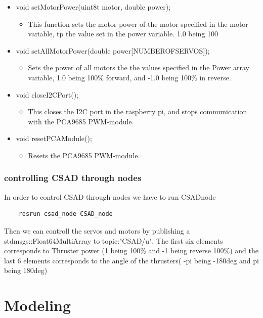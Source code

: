 \begin{itemize}
  \item void setMotorPower(uint8\textunderscore t motor, double power);  \begin{itemize}
    \item This function sets the motor power of the motor specified in the motor variable, tp the value set in the power variable. 1.0 being 100%
  \end{itemize}
  \item void setAllMotorPower(double power[NUMBER\textunderscore OF\textunderscore SERVOS]);  
  \begin{itemize}
    \item Sets the power of all motors the the values specified in the Power array variable,  1.0 being 100\% forward, and -1.0 being 100\% in reverse.
  \end{itemize}
  \newpage
  \item void closeI2CPort();  
  \begin{itemize}
    \item This closes the I2C port in the raspberry pi, and stops communication with the PCA9685 PWM-module.
  \end{itemize}
  \item void resetPCAModule();  
  \begin{itemize}
    \item Resets the PCA9685 PWM-module.
  \end{itemize}
\end{itemize}

\subsection{controlling CSAD through nodes}
In order to control CSAD through nodes we have to run CSAD\textunderscore node
\begin{verbatim}
    rosrun csad_node CSAD_node
\end{verbatim}
Then we can controll the servos and motors by publishing a std\textunderscore msgs::Float64MultiArray to topic:"CSAD/u". The first six elements corresponds to Thruster power (1 being 100\% and -1 being reverse 100\%) and the last 6 elements corresponds to the angle of the thrusters( -pi being -180deg and pi being 180deg)


\chapter{Modeling}
